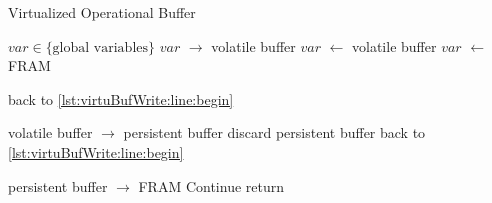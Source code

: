 		\begin{algorithm}[t]
			\caption{Virtualized Operational Buffer}
			\label{algo:virtuBufWrite}
			\scriptsize
			\begin{algorithmic}[1]
				\State $var \in \text{\{global variables\}} $ 
				\State \label{lst:virtuBufWrite:line:begin} 
				 
					\State $var$  $\rightarrow$ \textsf{volatile buffer} \label{lst:virtuBufWrite:line:output}
									\label{lst:virtuBufWrite:line:inputBegin}
							\State $var$  $\leftarrow$  \textsf{volatile buffer} 
						\Else 
							\State $var$  $\leftarrow$  \textsf{FRAM}		\label{lst:virtuBufWrite:line:inputEnd}
						\EndIf

						\State back to \ref{lst:virtuBufWrite:line:begin}
					\EndIf
				\EndWhile

				 \label{lst:virtuBufWrite:line:commitBegin} 
					\State \textsf{volatile buffer} $\rightarrow$  \textsf{persistent buffer}
						\State discard \textsf{persistent buffer}
						\State back to  \ref{lst:virtuBufWrite:line:begin} 
						\State   \label{lst:virtuBufWrite:line:commitEnd}
					\EndIf
				\EndWhile 

				 \label{lst:virtuBufWrite:line:SecCommitBegin} 
					\State \textsf{persistent buffer} $\rightarrow$ FRAM 
						\State Continue
					\EndIf
				\EndWhile 
				\State     \label{lst:virtuBufWrite:line:SecCommitEnd}
				\State return
			\end{algorithmic}
		\end{algorithm}


